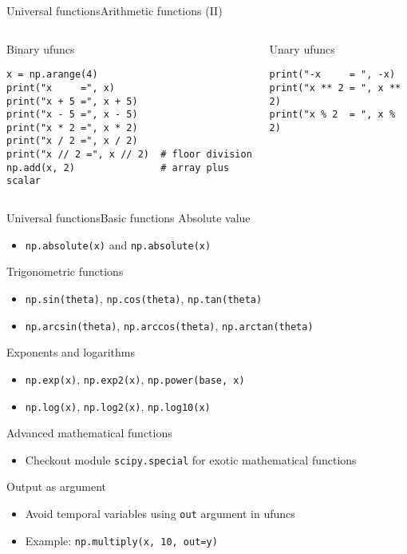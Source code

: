\documentclass[10pt,compress]{beamer} %
\begin{document}
\begin{frame}[fragile]{Universal functions}{Arithmetic functions (II)}
	\vspace{-0.2cm} 
	\begin{columns}
		\begin{exampleblock}{\footnotesize{Binary ufuncs}}
		\vspace{-0.2cm} 
			\begin{lstlisting}
x = np.arange(4)
print("x     =", x)
print("x + 5 =", x + 5)
print("x - 5 =", x - 5)
print("x * 2 =", x * 2)
print("x / 2 =", x / 2)
print("x // 2 =", x // 2)  # floor division
np.add(x, 2)               # array plus scalar
			\end{lstlisting}
		\vspace{-0.2cm} 
		\end{exampleblock}

		\begin{exampleblock}{\footnotesize{Unary ufuncs}}
		\vspace{-0.2cm} 
			\begin{lstlisting}
print("-x     = ", -x)
print("x ** 2 = ", x ** 2)
print("x % 2  = ", x % 2)
			\end{lstlisting}
		\vspace{-0.2cm} 
		\end{exampleblock}
	\end{columns}
\end{frame}

\begin{frame}{Universal functions}{Basic functions}
	Absolute value
	\begin{itemize}
		\item \texttt{np.absolute(x)} and \texttt{np.absolute(x)}
	\end{itemize}
	Trigonometric functions
	\begin{itemize}
		\item \texttt{np.sin(theta)}, \texttt{np.cos(theta)}, \texttt{np.tan(theta)}
		\item \texttt{np.arcsin(theta)}, \texttt{np.arccos(theta)}, \texttt{np.arctan(theta)}
	\end{itemize}
	Exponents and logarithms
	\begin{itemize}
		\item \texttt{np.exp(x)}, \texttt{np.exp2(x)}, \texttt{np.power(base, x)}
		\item \texttt{np.log(x)}, \texttt{np.log2(x)}, \texttt{np.log10(x)}
	\end{itemize}
	Advanced mathematical functions
	\begin{itemize}
		\item Checkout module \texttt{scipy.special} for exotic mathematical functions
	\end{itemize}
	Output as argument
	\begin{itemize}
		\item Avoid temporal variables using \texttt{out} argument in ufuncs
		\item Example: \texttt{np.multiply(x, 10, out=y)} 
	\end{itemize}
\end{frame}
\end{document}
